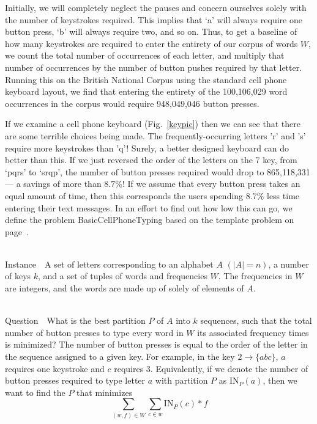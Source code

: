\documentclass[runningheads]{llncs}
\newcommand{\Instance}{{\sc Instance~}}
\newcommand{\Question}{~\\
{\sc Question~}}
\begin{document}
Initially, we will completely neglect the pauses and concern ourselves solely
with the number of keystrokes required.  This implies that `a' will always
require one button press, `b' will always require two, and so on.  Thus, to get
a baseline of how many keystrokes are required to enter the entirety of our
corpus of words $W$, we count the total number of occurrences of each letter,
and multiply that number of occurrences by the number of button pushes
required by that letter.  Running this on the British National Corpus
using the standard cell phone keyboard layout, we find that entering the
entirety of the 100,106,029 word occurrences in the corpus would require
948,049,046 button presses.  

If we examine a cell phone keyboard (Fig.~\ref{keypic}) then we can see that
there are some terrible choices being made.  The frequently-occurring letters
'r' and 's' require more keystrokes than 'q'!  Surely, a better designed
keyboard can do better than this.  If we just reversed the order of the letters
on the 7 key, from `pqrs' to `srqp', the number of button presses required
would drop to 865,118,331 --- a savings of more than $8.7\%$!  If we assume
that every button press takes an equal amount of time, then this corresponds
the users spending $8.7\%$ less time entering their text messages.  In an
effort to find out how low this can go, we define the problem {\sc
BasicCellPhoneTyping} based on the template problem on
page~\pageref{probtemplate}.

\begin{prob}[{\sc BasicCellPhoneTyping}]~\\
\Instance\ A set of letters corresponding to an alphabet $A$ $(|A| =
n)$, a number of keys $k$, and a set of
tuples of words and frequencies $W$.  The frequencies in $W$ are integers,
and the words are made up of solely of elements of $A$. 

\Question\ What is the best partition $P$ of $A$ into $k$ sequences, such
that the total number of button presses to type every word in $W$ its
associated frequency times is minimized?  The number of button presses is equal
to the order of the letter in the sequence assigned to a given key.  For
example, in the key $2\to\{abc\}$, $a$ requires one keystroke and $c$ requires
3.  Equivalently, if we denote the number of button presses required to type
letter $a$ with partition $P$ as $\mathrm{IN}_P(a)$, then we want to find the $P$ that
minimizes $$\sum_{(w,f) \in W}\sum_{c\in w} \mathrm{IN}_P(c) * f$$
\label{bcpt}
\end{prob}
\end{document}
